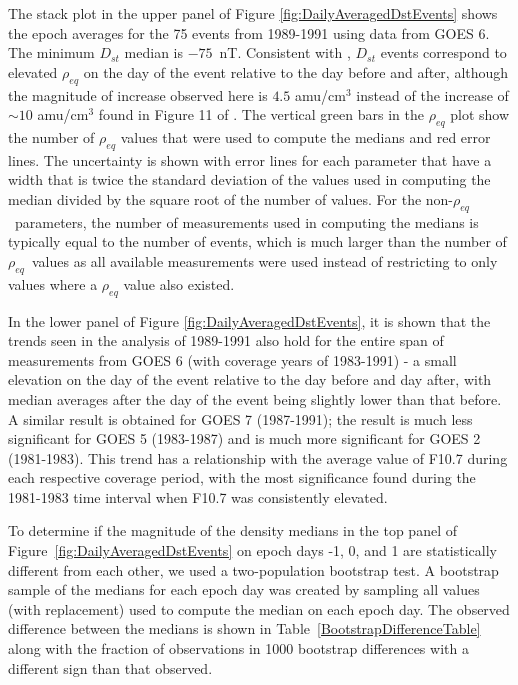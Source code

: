 \documentclass[12pt]{article}
\begin{document}
The stack plot in the upper panel of Figure \ref{fig:DailyAveragedDstEvents} shows the epoch averages for the 75 events from 1989-1991 using data from GOES 6.  The minimum $D_{st}$ median is $-75$~nT.  Consistent with \cite{Takahashi2010}, $D_{st}$ events correspond to elevated $\rho_{eq}$ on the day of the event relative to the day before and after, although the magnitude of increase observed here is $4.5$ amu/cm$^3$ instead of the increase of ${\sim} 10$ amu/cm$^3$ found in Figure 11 of \cite{Takahashi2010}.  The vertical green bars in the $\rho_{eq}$ plot show the number of $\rho_{eq}$ values that were used to compute the medians and red error lines.  The uncertainty is shown with error lines for each parameter that have a width that is twice the standard deviation of the values used in computing the median divided by the square root of the number of values. For the non-$\rho_{eq}$\ parameters, the number of measurements used in computing the medians is typically equal to the number of events, which is much larger than the number of $\rho_{eq}$\ values as all available measurements were used instead of restricting to only values where a $\rho_{eq}$ value also existed.

In the lower panel of Figure \ref{fig:DailyAveragedDstEvents}, it is shown that the trends seen in the analysis of 1989-1991 also hold for the entire span of measurements from GOES 6 (with coverage years of 1983-1991) - a small elevation on the day of the event relative to the day before and day after, with median averages after the day of the event being slightly lower than that before.  A similar result is obtained for GOES 7 (1987-1991); the result is much less significant for GOES 5 (1983-1987) and is much more significant for GOES 2 (1981-1983).  This trend has a relationship with the average value of F10.7 during each respective coverage period, with the most significance found during the 1981-1983 time interval when F10.7 was consistently elevated.

To determine if the magnitude of the density medians in the top panel of Figure~\ref{fig:DailyAveragedDstEvents} on epoch days -1, 0, and 1 are statistically different from each other, we used a two-population bootstrap test.  A bootstrap sample of the medians for each epoch day was created by sampling all values (with replacement) used to compute the median on each epoch day.  The observed difference between the medians is shown in Table~\ref{BootstrapDifferenceTable} along with the fraction of observations in 1000 bootstrap differences with a different sign than that observed. 
\end{document}
